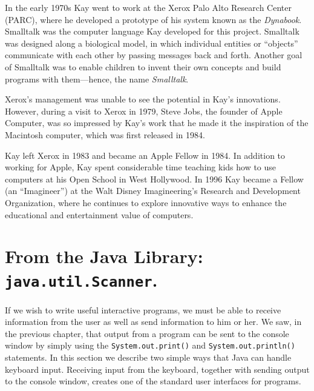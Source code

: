 In the early 1970s Kay went to work at the Xerox Palo Alto Research
Center (PARC), where he developed a prototype of his system known as
the {\it Dynabook}.  Smalltalk was the computer language Kay developed
for this project. Smalltalk was designed along a biological model, in
which individual entities or ``objects'' communicate with each other
by passing messages back and forth. Another goal of Smalltalk was to
enable children to invent their own concepts and build programs with
them---hence, the name {\it Smalltalk}.

Xerox's management was unable to see the potential in Kay's
innovations. However, during a visit to Xerox in 1979, Steve Jobs, the
founder of Apple Computer, was so impressed by Kay's work that he made
it the inspiration of the Macintosh computer, which was first released
in 1984.

Kay left Xerox in 1983 and became an Apple Fellow in 1984.  In
addition to working for Apple, Kay spent considerable time teaching
kids how to use computers at his Open School in West Hollywood.  In
1996 Kay became a Fellow (an ``Imagineer'') at the Walt Disney
Imagineering's Research and Development Organization, where he continues
to explore innovative ways to enhance the educational and
entertainment value of computers.

\section{From the Java Library: {\tt java.util.Scanner}.}
\label{pg-sec-scannerclass}

If we wish to write useful interactive programs, we must be able to receive
information from the user as well as send information to him or her.  
We saw, in the previous chapter, that output from a program can
be sent to the console window by simply using the {\tt System.out.print()}
and {\tt System.out.println()} statements. In this section we describe two 
simple ways that Java can handle keyboard input. Receiving input from the keyboard,
together with sending output to the console window, creates one of the standard
user interfaces for programs.

